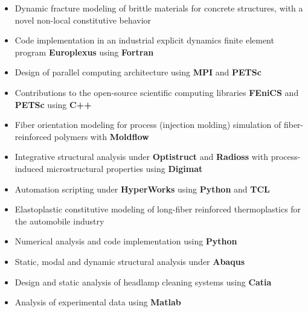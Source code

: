 \documentclass[10pt,a4paper]{altacv}
\begin{document}
\divider

\begin{itemize}
\item Dynamic fracture modeling of brittle materials for concrete structures, with a novel non-local constitutive behavior
\item Code implementation in an industrial explicit dynamics finite element program \textbf{Europlexus} using \textbf{Fortran}
\item Design of parallel computing architecture using \textbf{MPI} and \textbf{PETSc}
\item Contributions to the open-source scientific computing libraries \textbf{FEniCS} and \textbf{PETSc} using \textbf{C++}
\end{itemize}

\divider

\begin{itemize}
\item Fiber orientation modeling for process (injection molding) simulation of fiber-reinforced polymers with \textbf{Moldflow}
\item Integrative structural analysis under \textbf{Optistruct} and \textbf{Radioss} with process-induced microstructural properties using \textbf{Digimat}
\item Automation scripting under \textbf{HyperWorks} using \textbf{Python} and \textbf{TCL}
\end{itemize}

\divider

\begin{itemize}
\item Elastoplastic constitutive modeling of long-fiber reinforced thermoplastics for the automobile industry
\item Numerical analysis and code implementation using \textbf{Python}
\item Static, modal and dynamic structural analysis under \textbf{Abaqus}
\end{itemize}

\divider

\begin{itemize}
\item Design and static analysis of headlamp cleaning systems using \textbf{Catia}
\item Analysis of experimental data using \textbf{Matlab}
\end{itemize}
\end{document}
